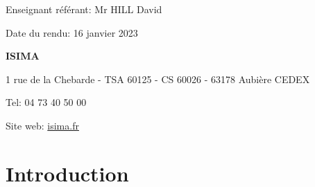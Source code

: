 \documentclass[12pt,french]{article} %
\begin{document}
\begin{titlepage}
  \vspace*{2cm} 
  
  \begin{flushright}\footnotesize %
    Enseignant référant: Mr HILL David
    
    Date du rendu: 16 janvier 2023
    
  \end{flushright}
  
  \begin{flushleft}\small %
    \textbf{ISIMA}
    \footnotesize
    
    1 rue de la Chebarde - TSA 60125 - CS 60026 - 63178 Aubière CEDEX
    
    Tel: 04 73 40 50 00
    
    Site web: \href{https://www.isima.fr/}{isima.fr}\newline
    	
  \end{flushleft}
\end{titlepage}	


\renewcommand{\contentsname}{Sommaire}
\normalsize\tableofcontents %

\vspace{2cm}

\section{Introduction}
\end{document}
